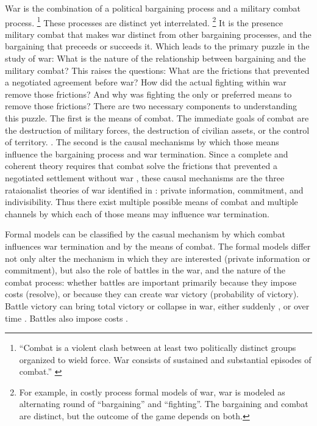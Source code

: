 War is the combination of a political bargaining process and a military combat process. %
\footnote{%
  ``Combat is a violent clash between at least two politically
  distinct groups organized to wield force. War consists of sustained
  and substantial episodes of combat.'' \parencite{Reiter2003} %
} %
These processes are distinct yet interrelated.%
\footnote{%
  For example, in costly process formal models of war, war is modeled
  as alternating round of ``bargaining'' and ``fighting''. %
  The bargaining and combat are distinct, but the outcome of the game
  depends on both. %
} %
It is the presence military combat that makes war distinct from other bargaining processes, and the bargaining that preceeds or succeeds it. %
Which leads to the primary puzzle in the study of war: What is the nature of the relationship between bargaining and the military combat? 
This raises the questions:
What are the frictions that prevented a negotiated agreement before war?
How did the actual fighting within war remove those frictions?
And why was fighting the only or preferred means to remove those frictions? 
There are two necessary components to understanding this puzzle. %
The first is the means of combat. %
The immediate goals of combat are the destruction of military forces, the destruction of civilian assets, or the control of territory.
\parencite[30]{Reiter2003}. %
The second is the causal mechanisms by which those means influence the bargaining process and war termination. %
Since a complete and coherent theory requires that combat solve the frictions that prevented a negotiated settlement without war \parencite{LeventogluSlantchev2007}, these causal mechanisms are the three rataionalist theories of war identified in \textcite{Fearon1995}: private information, commitment, and indivisibility. %
Thus there exist multiple possible means of combat and multiple channels by which each of those means may influence war termination.

Formal models can be classified by the casual mechanism by which combat influences war termination and by the means of combat. %
The formal models differ not only alter the mechanism in which they are interested (private information or commitment), but also the role of battles in the war, and the nature of the combat process: whether battles are important primarily because they impose costs (resolve), or because they can create war victory (probability of victory). %
Battle victory can bring total victory or collapse in war, either suddenly \parencites{Powell2004}{Wagner2000}{LeventogluSlantchev2007}, or over time \parencites{Slantchev2003}{SmithStam2004}. 
Battles also impose costs \parencites{FilsonWerner2002}{Powell2004}{LeventogluSlantchev2007}. %


